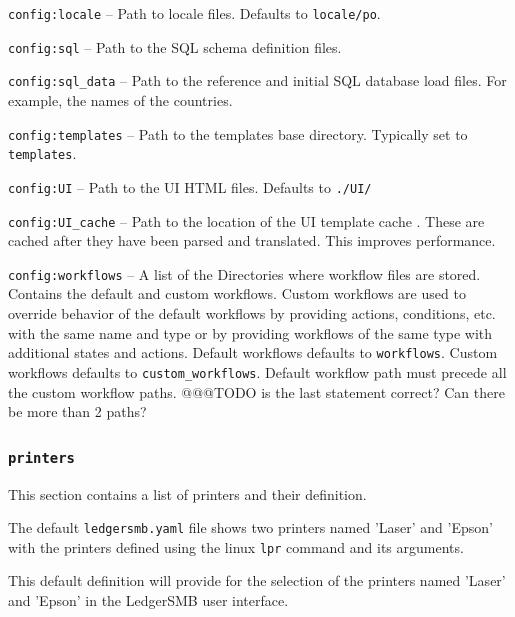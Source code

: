 \begin{description}
    \item {\texttt{config:locale}} – Path to locale  files. Defaults to \texttt{locale/po}.
    \item {\texttt{config:sql}} – Path to the SQL schema  definition files. 
    \item {\texttt{config:sql\_data}} – Path to the reference and initial SQL database load  files. For example, the names of the countries.
    \item {\texttt{config:templates}} – Path to the templates  base directory. Typically set to \texttt{templates}.
    \item {\texttt{config:UI}} – Path to the UI HTML  files. Defaults to \texttt{./UI/}
    \item {\texttt{config:UI\_cache}} – Path to the location of the UI template cache . These are cached after they have been parsed and translated. This improves performance.
    \item {\texttt{config:workflows}} – A list of the Directories where workflow files  are stored. Contains the default and custom workflows.  Custom workflows are used to override behavior of the default workflows by providing actions, conditions, etc. with the same name and type or by providing workflows of the same type with additional states and actions. Default workflows defaults to \texttt{workflows}. Custom workflows defaults to \texttt{custom\_workflows}. Default workflow path must precede all the custom workflow paths. @@@TODO is the last statement correct?  Can there be more than 2 paths?
\end{description}

\subsubsection{\texttt{printers}}
This section contains a list of printers  and their definition.

The default  \texttt{ledgersmb.yaml} file shows two printers  named 'Laser' and 'Epson' with the printers defined using the linux \texttt{lpr} command and its arguments. 

This default definition will provide for the selection of the printers named  'Laser' and 'Epson' in the LedgerSMB user interface.

